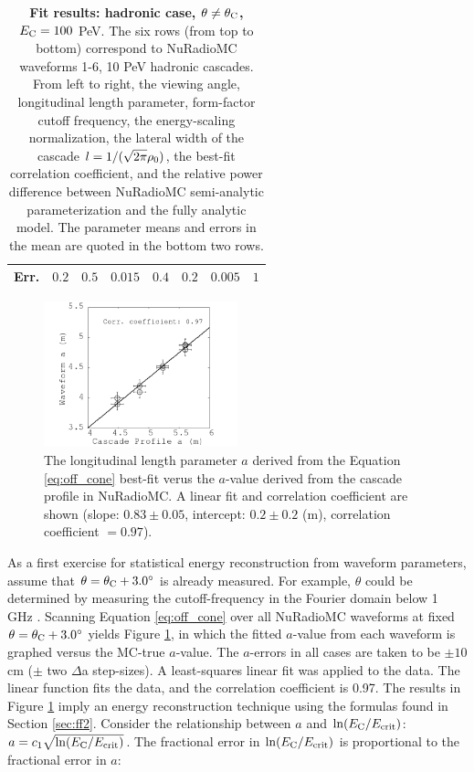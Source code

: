 \documentclass[amsmath,amssymb,aps,prd,10pt,twocolumn]{revtex4}
\begin{document}
\begin{table}
\begin{tabular}{|c|c|c|c|c|c|c|c|}
Err. & $0.2$ & $0.5$ & $0.015$ & $0.4$ & $0.2$ & $0.005$ & $1$ \\
\hline
\end{tabular}
\caption{\label{fit:tab:offcone_had} \textbf{Fit results: hadronic case, $\theta \neq \theta_{\rm C}$, $E_{\rm C} = 100$} PeV.  The six rows (from top to bottom) correspond to NuRadioMC waveforms 1-6, 10 PeV hadronic cascades.  From left to right, the viewing angle, longitudinal length parameter, form-factor cutoff frequency, the energy-scaling normalization, the lateral width of the cascade $l = 1/(\sqrt{2\pi} \rho_{\rm 0})$, the best-fit correlation coefficient, and the relative power difference between NuRadioMC semi-analytic parameterization and the fully analytic model.  The parameter means and errors in the mean are quoted in the bottom two rows.}
\end{table}
\endgroup

\begin{figure}
\centering
\includegraphics[width=0.5\textwidth]{Sept27_plot1.png}
\caption{\label{fit:fig:a_vs_a} The longitudinal length parameter $a$ derived from the Equation \ref{eq:off_cone} best-fit verus the $a$-value derived from the cascade profile in NuRadioMC.  A linear fit and correlation coefficient are shown (slope: $0.83\pm 0.05$, intercept: $0.2\pm 0.2$ (m), correlation coefficient $= 0.97$).}
\end{figure}


As a first exercise for statistical energy reconstruction from waveform parameters, assume that $\theta = \theta_{\rm C} + 3.0^{\circ}$ is already measured.  For example, $\theta$ could be determined by measuring the cutoff-frequency in the Fourier domain below 1 GHz \cite{10.1016/j.astropartphys.2017.03.008}.  Scanning Equation \ref{eq:off_cone} over all NuRadioMC waveforms at fixed $\theta=\theta_{\rm C} + 3.0^{\circ}$ yields Figure \ref{fit:fig:a_vs_a}, in which the fitted $a$-value from each waveform is graphed versus the MC-true $a$-value.  The $a$-errors in all cases are taken to be $\pm 10$ cm ($\pm$ two $\Delta$a step-sizes).  A least-squares linear fit was applied to the data.  The linear function fits the data, and the correlation coefficient is 0.97.  The results in Figure \ref{fit:fig:a_vs_a} imply an energy reconstruction technique using the formulas found in Section \ref{sec:ff2}.  Consider the relationship between $a$ and $\ln(E_{\rm C}/E_{\rm crit})$: $a = c_1 \sqrt{\ln(E_{\rm C}/E_{\rm crit})}$.  The fractional error in $\ln(E_{\rm C}/E_{\rm crit})$ is proportional to the fractional error in $a$:
\end{document}

